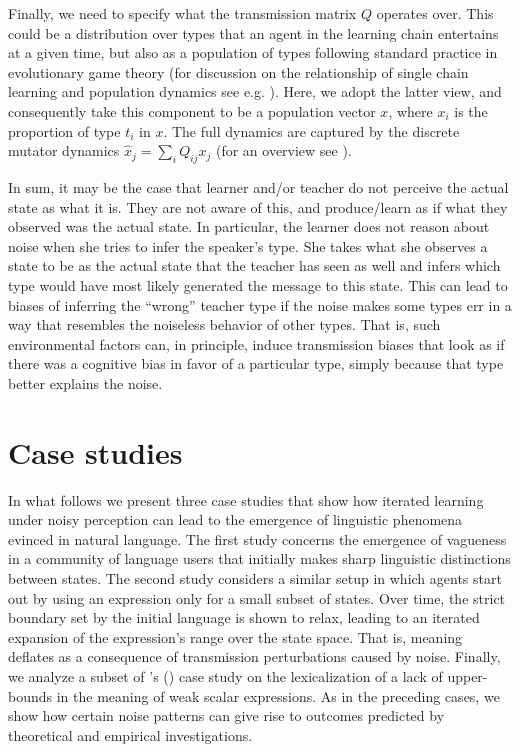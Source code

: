 \documentclass[10pt,a4paper]{article}
\newcommand{\citeposs}[2][]{\citeauthor{#2}'s (\citeyear[#1]{#2})}
\begin{document}
Finally, we need to specify what the transmission matrix $Q$ operates over. This could be a distribution over types that an agent in the learning chain entertains at a given time, but also as a population of types following standard practice in evolutionary game theory (for discussion on the relationship of single chain learning and population dynamics see e.g. \citealt[\S 7]{griffiths+kalish:2007}). Here, we adopt the latter view, and consequently take this component to be a population vector $x$, where $x_i$ is the proportion of type $t_i$ in $x$. The full dynamics are captured by the discrete mutator dynamics $\hat{x}_j = \sum_i Q_{ij} x_j$ (for an overview see \citealt{hofbauer+sigmund:2003}).

In sum, it may be the case that learner and/or teacher do not perceive the actual state as what it is. They are not aware of this, and produce/learn as if what they observed was the actual state. In particular, the learner does not reason about noise when she tries to infer the speaker's type. She takes what she observes a state to be as the actual state that the teacher has seen as well and infers which type would have most likely generated the message to this state. This can lead to biases of inferring the ``wrong'' teacher type if the noise makes some types err in a way that resembles the noiseless behavior of other types. That is, such environmental factors can, in principle, induce transmission biases that look as if there was a cognitive bias in favor of a particular type, simply because that type better explains the noise.


\section{Case studies}
In what follows we present three case studies that show how iterated learning under noisy perception can lead to the emergence of linguistic phenomena evinced in natural language. The first study concerns the emergence of vagueness in a community of language users that initially makes sharp linguistic distinctions between states. The second study considers a similar setup in which agents start out by using an expression only for a small subset of states. Over time, the strict boundary set by the initial language is shown to relax, leading to an iterated expansion of the expression's range over the state space. That is, meaning deflates as a consequence of transmission perturbations caused by noise. Finally, we analyze a subset of \citeposs{brochhagen+etal:2016:CogSci} case study on the lexicalization of a lack of upper-bounds in the meaning of weak scalar expressions. As in the preceding cases, we show how certain noise patterns can give rise to outcomes predicted by theoretical and empirical investigations. 
\end{document}
